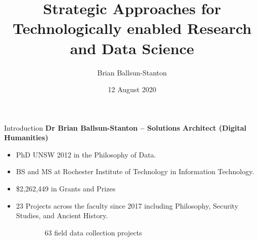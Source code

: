 \documentclass[aspectratio=169, 11pt]{beamer} %
\title{Strategic Approaches for Technologically enabled Research and Data Science} %
\author{Brian Ballsun-Stanton}               %
\institute{Faculty of Arts}         %
\date{12 August 2020}                 %
\begin{document}
\maketitle

\begin{frame}{Introduction}
\textbf{Dr Brian Ballsun-Stanton -- Solutions Architect (Digital Humanities)}
\begin{multicols}{2}
\begin{itemize}
    \item PhD UNSW 2012 in the Philosophy of Data. 
    \item BS and MS at Rochester Institute of Technology in Information Technology.
    \item \$2,262,449 in Grants and Prizes
    \item 23 Projects across the faculty since 2017 including Philosophy, Security Studies, and Ancient History.
\end{itemize}
\end{multicols}

\begin{figure}

    \begin{subfigure}{.19\textwidth}
    \centering

    \caption{63 field data collection projects}
    \end{subfigure}%
    \hfill%
    \begin{subfigure}{.19\textwidth}


\end{subfigure}
\end{figure}
\end{frame}
\end{document}
